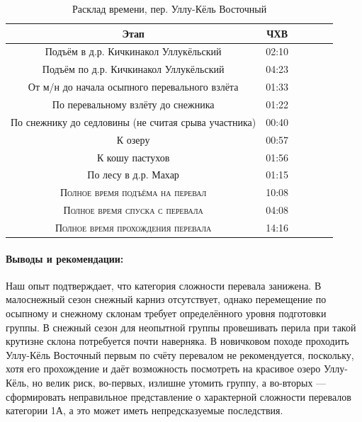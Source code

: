 \begin{table}[h!]
	\centering
	\begin{tabular}{|c|c|c|c|c|c|} 
		\hline 
		Этап & ЧХВ \\ 	
		\hline 
		Подъём в д.р. Кичкинакол Уллукёльский  & 02:10 \\
		Подъём по д.р. Кичкинакол Уллукёльский  & 04:23 \\
		От м/н до начала осыпного перевального взлёта & 01:33\\ 
		По перевальному взлёту до снежника & 01:22\\ 
		По снежнику до седловины (не считая срыва участника) & 00:40\\ 
		К озеру & 00:57 \\
		К кошу пастухов & 01:56 \\
		По лесу в д.р. Махар & 01:15 \\
		\hline
		\textsc{Полное время подъёма на перевал  }& 10:08\\
		\textsc{Полное время спуска с перевала }& 04:08 \\
	\textsc{	Полное время прохождения перевала }& 14:16 \\
		\hline
	\end{tabular}
	\caption{Расклад времени, пер. Уллу-Кёль Восточный}
\end{table}

\paragraph{Выводы и рекомендации:} Наш опыт подтверждает, что категория сложности перевала занижена. В малоснежный сезон снежный карниз отсутствует, однако перемещение по осыпному и снежному склонам требует определённого уровня подготовки группы. В снежный сезон для неопытной группы провешивать перила при такой крутизне склона потребуется почти наверняка. В новичковом походе проходить Уллу-Кёль Восточный первым по счёту перевалом не рекомендуется, поскольку, хотя его прохождение и даёт возможность посмотреть на красивое озеро Уллу-Кёль, но велик риск, во-первых, излишне утомить группу, а во-вторых --- сформировать неправильное представление о характерной сложности перевалов категории 1А, а это может иметь непредсказуемые последствия. 

\clearpage
